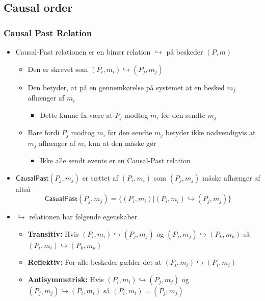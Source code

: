 \documentclass[a4, english]{article}
\begin{document}
\subsection{Causal order}
\subsubsection{Causal Past Relation}
\begin{itemize}
	\item Causal-Past relationen er en binær relation $\hookrightarrow$ på beskeder $(P,m)$ 
  \begin{itemize}
  	\item Den er skrevet som $(P_i,m_i) \hookrightarrow (P_j,m_j)$
    \item Den betyder, at på en gennemkørelse på systemet at en besked $m_j$ afhænger af $m_i$ 
    \begin{itemize}
      \item Dette kunne fx være at $P_j$ modtog $m_i$ før den sendte $m_j$  
    \end{itemize}
    \item Bare fordi $P_j$ modtog $m_i$ før den sendte $m_j$ betyder ikke nødvendigvis at $m_j$ afhænger af $m_i$ kun at den måske gør 
    \begin{itemize}
    	\item Ikke alle sendt events er en Causal-Past relation 
    \end{itemize}
  \end{itemize}
  \item $\mathsf{CausalPast}(P_j, m_j)$ er sættet af $(P_i, m_i)$ som $(P_j, m_j)$ måske afhænger af altså
\begin{equation*}
    \mathsf{CasualPast}(P_j,m_j) = \{ (P_i,m_i) | (P_i,m_i) \hookrightarrow (P_j, m_j)\}
\end{equation*}
  \item $\hookrightarrow$ relationen har følgende egenskaber 
  \begin{itemize}
    \item \textbf{Transitiv:} Hvis $(P_i, m_i) \hookrightarrow (P_j,m_j)$ og $(P_j, m_j) \hookrightarrow (P_k,m_k)$ så $(P_i, m_i) \hookrightarrow (P_k,m_k)$
    \item \textbf{Reflektiv:} For alle beskeder gælder det at $(P_i, m_i) \hookrightarrow (P_i,m_i)$
    \item \textbf{Antisymmetrisk:} Hvis $(P_i, m_i) \hookrightarrow (P_j,m_j)$ og $(P_j, m_j) \hookrightarrow (P_i,m_i)$ så $(P_i, m_i) = (P_j,m_j)$
  \end{itemize}

\end{itemize}
\end{document}
